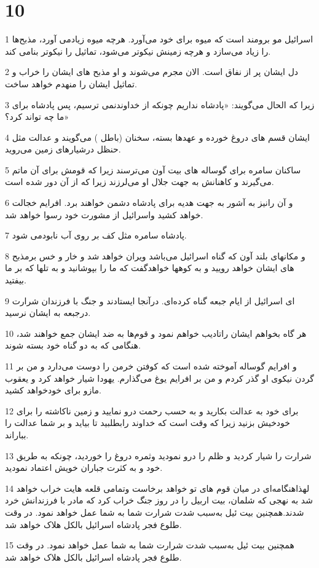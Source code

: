 \chapter{10}

\par 1 اسرائیل مو برومند است که میوه برای خود می‌آورد. هر‌چه میوه زیادمی آورد، مذبح‌ها را زیاد می‌سازد و هر‌چه زمینش نیکوتر می‌شود، تماثیل را نیکوتر بنامی کند.
\par 2 دل ایشان پر از نفاق است. الان مجرم می‌شوند و او مذبح های ایشان را خراب و تماثیل ایشان را منهدم خواهد ساخت.
\par 3 زیرا که الحال می‌گویند: «پادشاه نداریم چونکه از خداوندنمی ترسیم، پس پادشاه برای ما چه تواند کرد؟»
\par 4 ایشان قسم های دروغ خورده و عهدها بسته، سخنان (باطل ) می‌گویند و عدالت مثل حنظل درشیارهای زمین می‌روید.
\par 5 ساکنان سامره برای گوساله های بیت آون می‌ترسند زیرا که قومش برای آن ماتم می‌گیرند و کاهنانش به جهت جلال او می‌لرزند زیرا که از آن دور شده است.
\par 6 و آن رانیز به آشور به جهت هدیه برای پادشاه دشمن خواهند برد. افرایم خجالت خواهد کشید واسرائیل از مشورت خود رسوا خواهد شد.
\par 7 پادشاه سامره مثل کف بر روی آب نابودمی شود.
\par 8 و مکانهای بلند آون که گناه اسرائیل می‌باشد ویران خواهد شد و خار و خس برمذبح های ایشان خواهد رویید و به کوهها خواهدگفت که ما را بپوشانید و به تلها که بر ما بیفتید.
\par 9 ‌ای اسرائیل از ایام جبعه گناه کرده‌ای. درآنجا ایستادند و جنگ با فرزندان شرارت درجبعه به ایشان نرسید.
\par 10 هر گاه بخواهم ایشان راتادیب خواهم نمود و قوم‌ها به ضد ایشان جمع خواهند شد، هنگامی که به دو گناه خود بسته شوند.
\par 11 و افرایم گوساله آموخته شده است که کوفتن خرمن را دوست می‌دارد و من بر گردن نیکوی او گذر کردم و من بر افرایم یوغ می‌گذارم. یهودا شیار خواهد کرد و یعقوب مازو برای خودخواهد کشید.
\par 12 برای خود به عدالت بکارید و به حسب رحمت درو نمایید و زمین ناکاشته را برای خودخیش بزنید زیرا که وقت است که خداوند رابطلبید تا بیاید و بر شما عدالت را بباراند.
\par 13 شرارت را شیار کردید و ظلم را درو نمودید وثمره دروغ را خوردید، چونکه به طریق خود و به کثرت جباران خویش اعتماد نمودید.
\par 14 لهذاهنگامه‌ای در میان قوم های تو خواهد برخاست وتمامی قلعه هایت خراب خواهد شد به نهجی که شلمان، بیت اربیل را در روز جنگ خراب کرد که مادر با فرزندانش خرد شدند.همچنین بیت ئیل به‌سبب شدت شرارت شما به شما عمل خواهد نمود. در وقت طلوع فجر پادشاه اسرائیل بالکل هلاک خواهد شد.
\par 15 همچنین بیت ئیل به‌سبب شدت شرارت شما به شما عمل خواهد نمود. در وقت طلوع فجر پادشاه اسرائیل بالکل هلاک خواهد شد.

